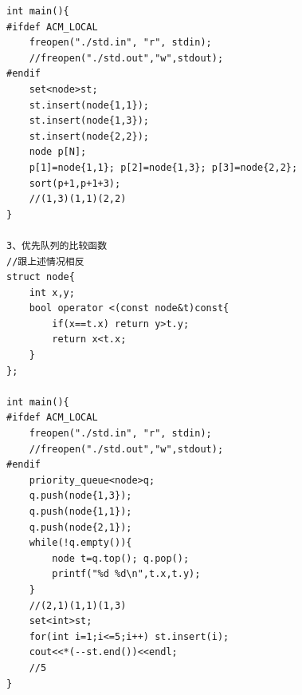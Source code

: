 \documentclass[twoside]{article}
\begin{document}
\begin{lstlisting}
int main(){
#ifdef ACM_LOCAL
    freopen("./std.in", "r", stdin);
    //freopen("./std.out","w",stdout);
#endif
    set<node>st;
    st.insert(node{1,1});
    st.insert(node{1,3});
    st.insert(node{2,2});
    node p[N];
    p[1]=node{1,1}; p[2]=node{1,3}; p[3]=node{2,2};
    sort(p+1,p+1+3);
    //(1,3)(1,1)(2,2)
}

3、优先队列的比较函数
//跟上述情况相反
struct node{
    int x,y;
    bool operator <(const node&t)const{
        if(x==t.x) return y>t.y;
        return x<t.x;
    }
};

int main(){
#ifdef ACM_LOCAL
    freopen("./std.in", "r", stdin);
    //freopen("./std.out","w",stdout);
#endif
    priority_queue<node>q;
    q.push(node{1,3});
    q.push(node{1,1});
    q.push(node{2,1});
    while(!q.empty()){
        node t=q.top(); q.pop();
        printf("%d %d\n",t.x,t.y);
    }
    //(2,1)(1,1)(1,3)
    set<int>st;
    for(int i=1;i<=5;i++) st.insert(i);
    cout<<*(--st.end())<<endl;
    //5
}













\end{lstlisting}
\end{document}
